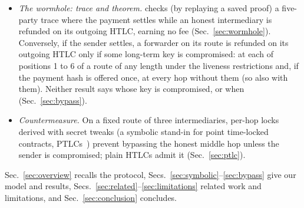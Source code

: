 \begin{itemize}[\setlength{\IEEElabelindent}{0pt}]
  () is necessary: without it, \tamarin{} finds a
  compromise-free trace in which an intermediary's outgoing HTLC is
  redeemed while its incoming one is refunded. None of the five liveness lemmas
  we check needs T1, and neither intermediary-safety lemma needs T2, from which
  the timeout order  is derived
  (Sec.~\ref{sec:timing}).
\item \emph{The wormhole: trace and theorem.} \tamarin{} checks (by
  replaying a saved proof) a five-party trace where the payment settles
  while an honest intermediary is refunded on its outgoing HTLC, earning no
  fee (Sec.~\ref{sec:wormhole}). Conversely, if the sender settles, a forwarder
  on its route is refunded on its outgoing HTLC only if some long-term key is
  compromised: at each of positions 1 to 6 of a route of any length under
  the liveness restrictions and, if the payment hash is offered once, at every
  hop without them (so also with them). Neither result says whose key is
  compromised, or when (Sec.~\ref{sec:bypass}).
\item \emph{Countermeasure.} On a fixed route of three intermediaries, per-hop
  locks derived with secret tweaks (a symbolic stand-in for point time-locked
  contracts, PTLCs~\cite{malavolta2019}) prevent bypassing the honest middle
  hop unless the sender is compromised; plain HTLCs admit it
  (Sec.~\ref{sec:ptlc}).
\end{itemize}
Sec.~\ref{sec:overview} recalls the protocol,
Secs.~\ref{sec:symbolic}--\ref{sec:bypass} give our model and results,
Secs.~\ref{sec:related}--\ref{sec:limitations} related work and limitations, and
Sec.~\ref{sec:conclusion} concludes.
